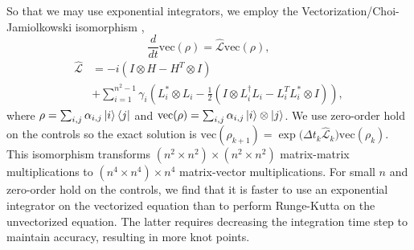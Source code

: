 So that we may use exponential integrators, we employ
the Vectorization/Choi-Jamiolkowski isomorphism \cite{Landi2018},
\begin{equation}
  \frac{d}{dt} \textrm{vec}({\rho}) = \hat{\mathcal{L}} \textrm{vec}({\rho}),
\end{equation}
\begin{equation}
  \begin{aligned}
    \hat{\mathcal{L}} &= -i(I \otimes H - H^{T} \otimes I)\\
    &+ \sum_{i = 1}^{n^{2} - 1} \gamma_{i}
    (L_{i}^{*} \otimes L_{i} - \frac{1}{2} (I \otimes L_{i}^{\dagger}L_{i}
    - L_{i}^{T}L_{i}^{*} \otimes I)),
  \end{aligned}
\end{equation}
where $\rho = \sum_{i, j} \alpha_{i, j} \ket{i}\bra{j}$
and $\textrm{vec}(\rho) = \sum_{i, j} \alpha_{i, j} \ket{i} \otimes \ket{j}$.
We use zero-order hold on the controls so the exact solution is
$\textrm{vec}(\rho_{k + 1}) = {\exp}{\textstyle(}\Delta t_{k} \hat{\mathcal{L}}_{k}{\textstyle)} \textrm{vec}(\rho_{k})$.
This isomorphism transforms $(n^{2} \times n^{2}) \times (n^{2} \times n^{2})$
matrix-matrix multiplications to $(n^{4} \times n^{4}) \times n^{4}$ matrix-vector
multiplications. For small $n$ and zero-order hold on the controls, we find that it is
faster to use an exponential integrator on the vectorized equation than to perform
Runge-Kutta on the unvectorized equation. The latter requires decreasing the integration
time step to maintain accuracy, resulting in more knot points.
